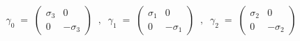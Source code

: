 \begin{equation}
\gamma_0 \;=\; \left( \begin{array}{cc}
                         \sigma_3 & 0 \\
                          0 & - \sigma_3
                         \end{array} \right)
\;\;,\;\;
\gamma_1 \;=\; \left( \begin{array}{cc}
                         \sigma_1 & 0 \\
                          0 & - \sigma_1
                         \end{array} \right)
\;\;,\;\;
\gamma_2 \;=\; \left( \begin{array}{cc}
                         \sigma_2 & 0 \\
                          0 & - \sigma_2
                         \end{array} \right)
\end{equation}

